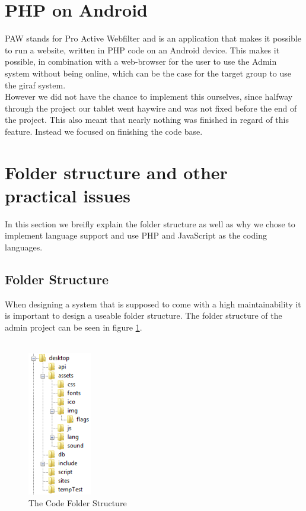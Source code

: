 \section{PHP on Android}
PAW stands for Pro Active Webfilter and is an application that makes it possible to run a website, written in PHP code on an Android device. This makes it possible, in combination with a web-browser for the user to use the Admin system without being online, which can be the case for the target group to use the \ac{giraf} system.\\
However we did not have the chance to implement this ourselves, since halfway through the project our tablet went haywire and was not fixed before the end of the project. This also meant that nearly nothing was finished in regard of this feature. Instead we focused on finishing the code base.

\section{Folder structure and other practical issues}
In this section we breifly explain the folder structure as well as why we chose to implement language support and use PHP and JavaScript as the coding languages.

\subsection{Folder Structure}
When designing a system that is supposed to come with a high maintainability it is important to design a useable folder structure. The folder structure of the admin project can be seen in figure \ref{fig:folderStructure}.\\
\\

\begin{figure}[htbp]
        \centering
                \includegraphics[width=0.25\textwidth]{images/folderStructure.png}
        \caption{The Code Folder Structure}
        \label{fig:folderStructure}
\end{figure}

